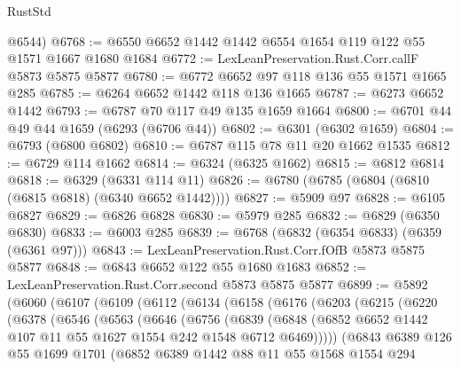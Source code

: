 \begin{lexlean}{RustStd}
\begin{coremodule}
{{      @6544)
@6768 := @6550 @6652 @1442 @1442 @6554 @1654 @119 @122 @55 @1571 @1667 @1680 @1684
@6772 := LexLeanPreservation.Rust.Corr.callF @5873 @5875 @5877
@6780 := @6772 @6652 @97 @118 @136 @55 @1571 @1665 @285
@6785 := @6264 @6652 @1442 @118 @136 @1665
@6787 := @6273 @6652 @1442
@6793 := @6787 @70 @117 @49 @135 @1659 @1664
@6800 := @6701 @44 @49 @44 @1659 (@6293 (@6706 @44))
@6802 := @6301 (@6302 @1659)
@6804 := @6793 (@6800 @6802)
@6810 := @6787 @115 @78 @11 @20 @1662 @1535
@6812 := @6729 @114 @1662
@6814 := @6324 (@6325 @1662)
@6815 := @6812 @6814
@6818 := @6329 (@6331 @114 @11)
@6826 := @6780 (@6785 (@6804 (@6810 (@6815 @6818) (@6340 @6652 @1442))))
@6827 := @5909 @97
@6828 := @6105 @6827
@6829 := @6826 @6828
@6830 := @5979 @285
@6832 := @6829 (@6350 @6830)
@6833 := @6003 @285
@6839 := @6768 (@6832 (@6354 @6833) (@6359 (@6361 @97)))
@6843 := LexLeanPreservation.Rust.Corr.fOfB @5873 @5875 @5877
@6848 := @6843 @6652 @122 @55 @1680 @1683
@6852 := LexLeanPreservation.Rust.Corr.second @5873 @5875 @5877
@6899 := @5892
    (@6060
      (@6107
        (@6109
          (@6112
            (@6134
              (@6158
                (@6176
                  (@6203
                    (@6215
                      (@6220
                        (@6378
                          (@6546
                            (@6563
                              (@6646
                                (@6756
                                  (@6839
                                    (@6848
                                      (@6852
                                        @6652
                                        @1442
                                        @107
                                        @11
                                        @55
                                        @1627
                                        @1554
                                        @242
                                        @1548
                                        @6712
                                        @6469)))))
                              (@6843
                                @6389
                                @126
                                @55
                                @1699
                                @1701
                                (@6852
                                  @6389
                                  @1442
                                  @88
                                  @11
                                  @55
                                  @1568
                                  @1554
                                  @294
}}
\end{coremodule}
\end{lexlean}
